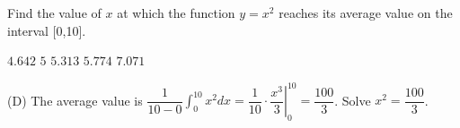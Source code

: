 \question
Find the value of $x$ at which the function $y=x^{2}$ reaches its average value on the interval [0,10].
\begin{choices}
  \choice $4.642$
  \choice $5$
  \choice $5.313$
  \CorrectChoice $5.774$
  \choice $7.071$
\end{choices}
\begin{solution}
(D) The average value is $\dfrac{1}{10-0} \int_{0}^{10} x^{2} d x=\left.\dfrac{1}{10} \cdot \dfrac{x^{3}}{3}\right|_{0} ^{10}=\dfrac{100}{3}$. Solve $x^{2}=\dfrac{100}{3}$.
\end{solution}
